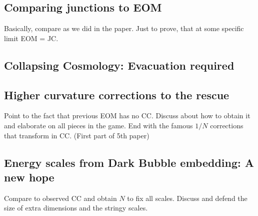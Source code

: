 \subsection{Comparing junctions to EOM}
Basically, compare as we did in the paper. Just to prove, that at some specific limit EOM = JC.
\subsection{Collapsing Cosmology: Evacuation required} 
\subsection{Higher curvature corrections to the rescue}
Point to the fact that previous EOM has no CC. Discuss about how to obtain it and elaborate on all pieces in the game. End with the famous $1/N$ corrections that transform in CC. (First part of 5th paper)
\subsection{Energy scales from Dark Bubble embedding: A new hope}\label{subsec: energy_scale}
Compare to observed CC and obtain $N$ to fix all scales. Discuss and defend the size of extra dimensions and the stringy scales.

